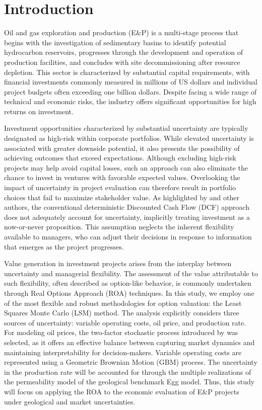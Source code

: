 \documentclass[pdflatex,sn-basic]{sn-jnl}%
\theoremstyle{thmstyleone}%
\theoremstyle{thmstyletwo}%
\theoremstyle{thmstylethree}%
\begin{document}
\section{Introduction}\label{sec1}

Oil and gas exploration and production (E\&P) is a multi-stage process that begins with the investigation of sedimentary basins to identify potential hydrocarbon reservoirs, progresses through the development and operation of production facilities, and concludes with site decommissioning after resource depletion. This sector is characterized by substantial capital requirements, with financial investments commonly measured in millions of US dollars and individual project budgets often exceeding one billion dollars. Despite facing a wide range of technical and economic risks, the industry offers significant opportunities for high returns on investment.

Investment opportunities characterized by substantial uncertainty are typically designated as high-risk within corporate portfolios. While elevated uncertainty is associated with greater downside potential, it also presents the possibility of achieving outcomes that exceed expectations. Although excluding high-risk projects may help avoid capital losses, such an approach can also eliminate the chance to invest in ventures with favorable expected values. Overlooking the impact of uncertainty in project evaluation can therefore result in portfolio choices that fail to maximize stakeholder value. As highlighted by \cite{ref9} and other authors, the conventional deterministic Discounted Cash Flow (DCF) approach does not adequately account for uncertainty, implicitly treating investment as a now-or-never proposition. This assumption neglects the inherent flexibility available to managers, who can adjust their decisions in response to information that emerges as the project progresses.

Value generation in investment projects arises from the interplay between uncertainty and managerial flexibility. The assessment of the value attributable to such flexibility, often described as option-like behavior, is commonly undertaken through Real Options Approach (ROA) techniques. In this study, we employ one of the most flexible and robust methodologies for option valuation: the Least Squares Monte Carlo (LSM) method. The analysis explicitly considers three sources of uncertainty: variable operating costs, oil price, and production rate. For modeling oil prices, the two-factor stochastic process introduced by \cite{ref17} was selected, as it offers an effective balance between capturing market dynamics and maintaining interpretability for decision-makers. Variable operating costs are represented using a Geometric Brownian Motion (GBM) process. The uncertainty in the production rate will be accounted for through the multiple realizations of the permeability model of the geological benchmark Egg model. Thus, this study will focus on applying the ROA to the economic evaluation of E\&P projects under geological and market uncertainties.
\end{document}
